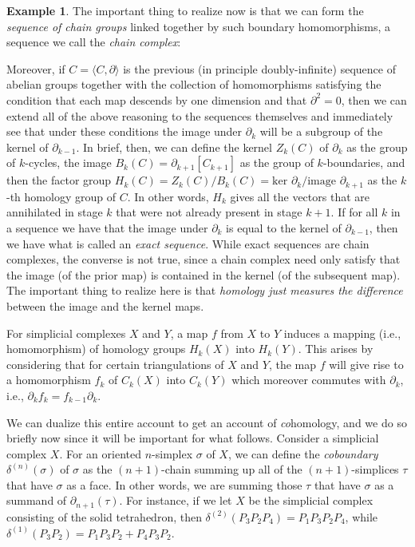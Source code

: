 \documentclass[a4paper]{book}
\theoremstyle{definition}
\newtheorem{example}{Example}[section]
\theoremstyle{definition}
\theoremstyle{definition}
\theoremstyle{theorem}
\theoremstyle{definition}
\begin{document}
\begin{example}
	The important thing to realize now is that we can form the \textit{sequence of chain groups} linked together by such boundary homomorphisms, a sequence we call the \textit{chain complex}: \par 
	\begin{center} 
	\end{center} 
	\par 
	Moreover, if $C = \langle C, \partial \rangle$ is the previous (in principle doubly-infinite) sequence of abelian groups together with the collection of homomorphisms satisfying the condition that each map descends by one dimension and that $\partial^2 = 0$, then we can extend all of the above reasoning to the sequences themselves and immediately see that under these conditions the image under $\partial_k$ will be a subgroup of the kernel of $\partial_{k-1}$. In brief, then, we can define the kernel $Z_k(C)$ of $\partial_k$ as the group of $k$-cycles, the image $B_k(C) = \partial_{k+1}[C_{k+1}]$ as the group of $k$-boundaries, and then the factor group $H_k(C) = Z_k(C)/B_k(C) = \text{ker } \partial_k / \text{image } \partial_{k+1}$ as the $k$-th homology group of $C$. In other words, $H_k$ gives all the vectors that are annihilated in stage $k$ that were not already present in stage $k+1$. If for all $k$ in a sequence we have that the image under $\partial_k$ is equal to the kernel of $\partial_{k-1}$, then we have what is called an \textit{exact sequence}. While exact sequences are chain complexes, the converse is not true, since a chain complex need only satisfy that the image (of the prior map) is contained in the kernel (of the subsequent map). The important thing to realize here is that \textit{homology just measures the difference} between the image and the kernel maps. \par 
	For simplicial complexes $X$ and $Y$, a map $f$ from $X$ to $Y$ induces a mapping (i.e., homomorphism) of homology groups $H_k(X)$ into $H_k(Y)$. This arises by considering that for certain triangulations of $X$ and $Y$, the map $f$ will give rise to a homomorphism $f_k$ of $C_k(X)$ into $C_k(Y)$ which moreover commutes with $\partial_k$, i.e., $\partial_k f_k = f_{k-1}\partial_k$. \par  
	We can dualize this entire account to get an account of \textit{co}homology, and we do so briefly now since it will be important for what follows. Consider a simplicial complex $X$. For an oriented $n$-simplex $\sigma$ of $X$, we can define the \textit{coboundary} $\delta^{(n)}(\sigma)$ of $\sigma$ as the $(n+1)$-chain summing up all of the $(n+1)$-simplices $\tau$ that have $\sigma$ as a face. In other words, we are summing those $\tau$ that have $\sigma$ as a summand of $\partial_{n+1}(\tau)$. For instance, if we let $X$ be the simplicial complex consisting of the solid tetrahedron, then $\delta^{(2)}(P_3P_2P_4) = P_1P_3P_2P_4$, while $\delta^{(1)}(P_3P_2) = P_1P_3P_2 + P_4P_3P_2$.\par 

\end{example}
\end{document}
